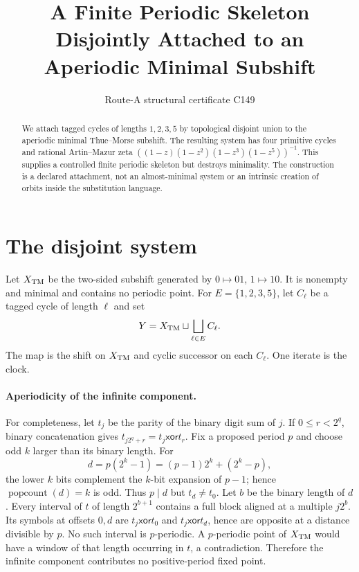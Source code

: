 \documentclass[10pt]{article}
\title{A Finite Periodic Skeleton Disjointly Attached to an\\Aperiodic Minimal Subshift}
\author{Route-A structural certificate C149}
\date{}
\begin{document}
\maketitle
\small
\begin{abstract}
We attach tagged cycles of lengths $1,2,3,5$ by topological disjoint union to the aperiodic minimal
Thue--Morse subshift.  The resulting system has four primitive cycles and
rational Artin--Mazur zeta
$((1-z)(1-z^2)(1-z^3)(1-z^5))^{-1}$.  This supplies a controlled finite
periodic skeleton but destroys minimality.
The construction is a declared attachment, not an almost-minimal system or an
intrinsic creation of orbits inside the substitution language.
\end{abstract}

\section{The disjoint system}
Let $X_{\rm TM}$ be the two-sided subshift generated by
$0\mapsto01$, $1\mapsto10$.  It is nonempty and minimal and contains no
periodic point.  For $E=\{1,2,3,5\}$, let $C_\ell$ be a tagged cycle of length
$\ell$ and set
\[
Y=X_{\rm TM}\sqcup\bigsqcup_{\ell\in E}C_\ell .
\]
The map is the shift on $X_{\rm TM}$ and cyclic successor on each $C_\ell$.
One iterate is the clock.

\paragraph{Aperiodicity of the infinite component.}
For completeness, let $t_j$ be the parity of the binary digit sum of $j$.
If $0\leq r<2^q$, binary concatenation gives
$t_{j2^q+r}=t_j\mathbin{\mathsf{xor}}t_r$.  Fix a proposed period $p$ and
choose odd $k$ larger than its binary length.  For
\[
d=p(2^k-1)=(p-1)2^k+(2^k-p),
\]
the lower $k$ bits complement the $k$-bit expansion of $p-1$; hence
$\operatorname{popcount}(d)=k$ is odd.  Thus $p\mid d$ but $t_d\ne t_0$.
Let $b$ be the binary length of $d$.  Every interval of $t$ of length
$2^{b+1}$ contains a full block aligned at a multiple $j2^b$.  Its symbols at
offsets $0,d$ are $t_j\mathbin{\mathsf{xor}}t_0$ and
$t_j\mathbin{\mathsf{xor}}t_d$, hence are opposite at a distance divisible by
$p$.  No such interval is $p$-periodic.  A $p$-periodic point of $X_{\rm TM}$
would have a window of that length occurring in $t$, a contradiction.
Therefore the infinite component contributes no positive-period fixed point.
\end{document}
